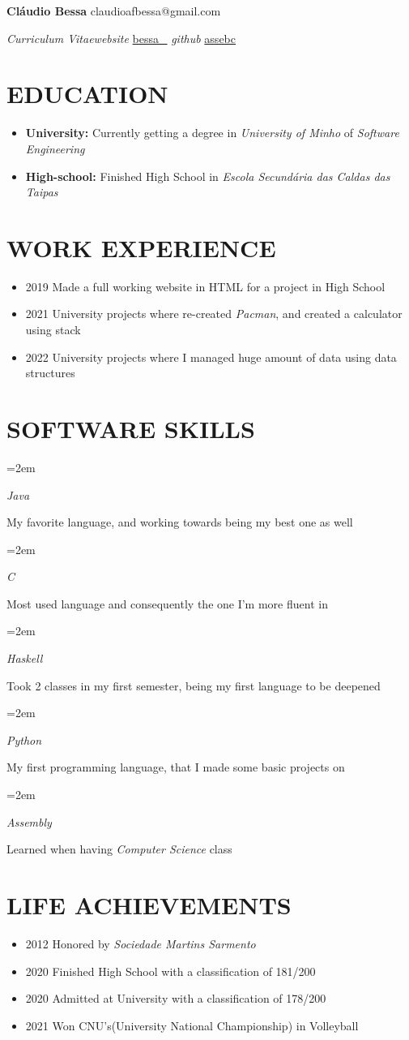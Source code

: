 \documentclass[paper=a4,fontsize=11pt]{scrartcl} %
\newlength{\spacebox}
\newcommand{\sepspace}{\vspace*{0.5em}}		%
\newcommand{\NameEmailPhoneSiteGithub}[5]{
    \Huge \usefont{OT1}{phv}{m}{n} \textbf{#1}
    \large \usefont{OT1}{phv}{m}{n} \hfill #2\hspace{25pt}#3

    \textit{Curriculum Vitae}\hfill \textit{website } #4 \hspace{25pt}\textit{github } #5
    \par \normalsize \normalfont
}
\newcommand{\NewPart}[1]{\section*{\uppercase{#1}}}
\newcommand{\SkillsEntry}[2]{      %
    \noindent\hangindent=2em\hangafter=0 %
    \parbox{\spacebox}{        %
        \textit{#1}}			   %
    \hspace{1.5em} #2 \par}    %
\begin{document}
    \NameEmailPhoneSiteGithub{Cláudio Bessa}{               }{claudioafbessa@gmail.com}
    {\href{https://www.youtube.com/channel/UCKz1tkzbzC6SV9CYF7qRE3g}{bessa_}}
    {\href{https://github.com/assebc}{assebc}}

    \sepspace

    \NewPart{Education}{}
    \begin{itemize}
        \item[] \textbf{University:} Currently getting a degree in \textit{University of Minho} of \textit{Software Engineering}
        \item[] \textbf{High-school:} Finished High School in \textit{Escola Secundária das Caldas das Taipas}
    \end{itemize}

    \sepspace

    \NewPart{Work Experience}{}

    \begin{itemize}
        \item[] 2019 Made a full working website in HTML for a project in High School
        \item[] 2021 University projects where re-created \textit{Pacman}, and created a calculator using stack
        \item[] 2022 University projects where I managed huge amount of data using data structures
    \end{itemize}

    \sepspace

    \NewPart{Software Skills}{}

    \SkillsEntry{Java}{My favorite language, and working towards being my best one as well}
    \SkillsEntry{C}{Most used language and consequently the one I'm more fluent in}
    \SkillsEntry{Haskell}{Took 2 classes in my first semester, being my first language to be deepened}
    \SkillsEntry{Python}{My first programming language, that I made some basic projects on}
    \SkillsEntry{Assembly}{Learned when having \textit{Computer Science} class}


    \NewPart{Life Achievements}{}

    \begin{itemize}
        \item[] 2012 Honored by \textit{Sociedade Martins Sarmento}
        \item[] 2020 Finished High School with a classification of 181/200
        \item[] 2020 Admitted at University with a classification of 178/200
        \item[] 2021 Won CNU's(University National Championship) in Volleyball
    \end{itemize}
\end{document}
